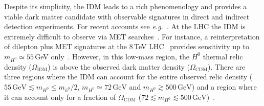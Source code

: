 \documentclass[preprint,number,sort&compress,twocolumn,3p]{elsstyarticle}
\newcommand{\Hn}{{H^0}}
\newcommand{\An}{A^0}
\newcommand{\Hp}{{H^\pm}}
\begin{document}
Despite its simplicity, the IDM leads to a rich phenomenology and provides a viable dark matter candidate
with observable signatures in direct and indirect detection experiments. For recent accounts 
see \emph{e.g.}~\cite{Ilnicka:2015jba,Belyaev:2016lok,Eiteneuer:2017hoh}. 
At the LHC the IDM is extremely difficult to observe via MET searches~\cite{Pierce:2007ut,Cao:2007rm,Dolle:2009ft,Miao:2010rg,Gustafsson:2012aj,Belanger:2015kga}. For instance, a reinterpretation of dilepton plus MET signatures at the 8\,TeV LHC~\cite{Aad:2014vma}
provides sensitivity up to $m_{\Hn}\simeq 55\,$GeV only~\cite{Belanger:2015kga}. 
However, in this low-mass region, the $\Hn$ thermal relic density ($\Omega_{\text{IDM}}$) is above
the observed dark matter density ($\Omega_{\text{CDM}}$).
There are three regions where the IDM can account for the entire observed relic density ($55\,\text{GeV}\lesssim m_{\Hn} \le m_{h^0}/2$, $m_{\Hn}\simeq72\,\text{GeV}$ and $m_{\Hn}\gtrsim 500\,\text{GeV}$) and a region where it can account only for a fraction of $\Omega_{\text{CDM}}$  ($72 \lesssim m_{\Hn} \lesssim 500\,\text{GeV}$)~\cite{Goudelis:2013uca,Eiteneuer:2017hoh}.
\end{document}
